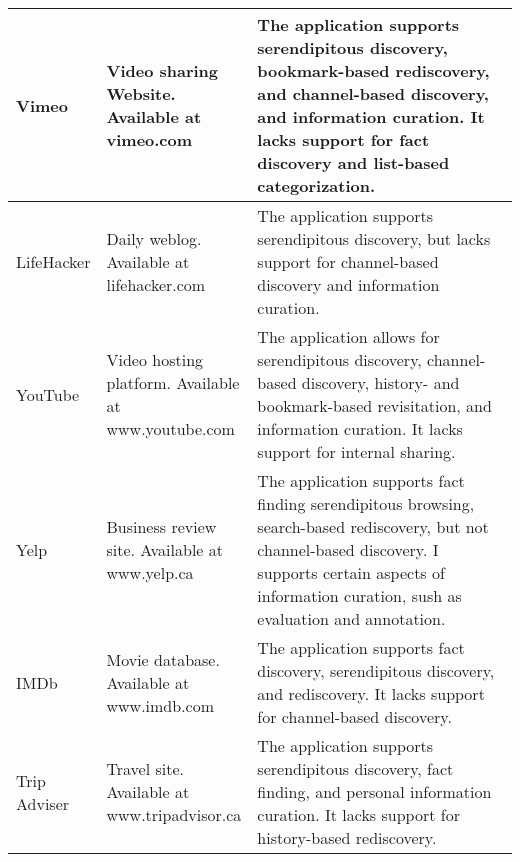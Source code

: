 \documentclass{casconpaper}
\begin{document}
{{\begin{table*}[htbp]
\begin{tabular}{|p{0.11\linewidth}| p{0.22\linewidth}| p{0.67\linewidth}|}
\hline
Vimeo           & \raggedright Video sharing Website. Available at vimeo.com                                & The application supports serendipitous discovery, bookmark-based rediscovery, and channel-based discovery, and information curation. It lacks support for fact discovery and list-based categorization. \\
\hline
LifeHacker      & \raggedright Daily weblog. Available at lifehacker.com                                    & The application supports serendipitous discovery, but lacks support for channel-based discovery and information curation.                                                                                                                                                                                                 \\
\hline
YouTube         & \raggedright Video hosting platform. Available at www.youtube.com                         & The application allows for serendipitous discovery, channel-based discovery, history- and bookmark-based revisitation, and information curation. It lacks support for internal sharing.                                                                                                                                                \\
\hline
Yelp            & \raggedright Business review site. Available at www.yelp.ca                               & The application supports fact finding serendipitous browsing, search-based rediscovery, but not channel-based discovery. I supports certain aspects of information curation, sush as evaluation and annotation.                                                                                                 \\
\hline
IMDb            & \raggedright Movie database. Available at www.imdb.com                                    & The application supports fact discovery, serendipitous discovery, and rediscovery. It lacks support for channel-based discovery.                                                                                                                                                          \\
\hline
Trip Adviser    & \raggedright Travel site. Available at www.tripadvisor.ca                                 & The application supports serendipitous discovery, fact finding, and personal information curation. It lacks support for history-based rediscovery.                                                                                                                                 \\

\end{tabular}
\end{table*}}}
\end{document}
